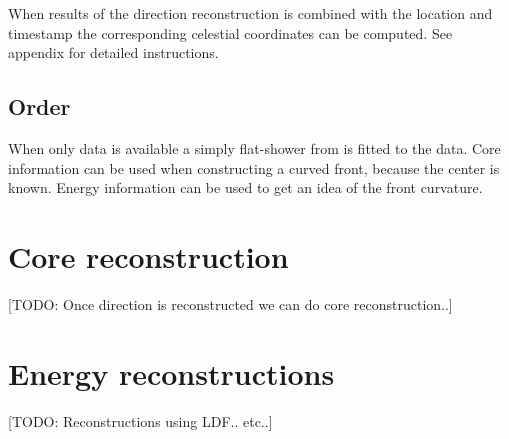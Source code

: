 When results of the direction reconstruction is combined with the \gps
location and timestamp the corresponding celestial coordinates can be
computed. See appendix for detailed instructions.


\subsection{Order}

When only data is available a simply flat-shower from is fitted to the
data. Core information can be used when constructing a curved front,
because the center is known. Energy information can be used to get an
idea of the front curvature.


\section{Core reconstruction}

[TODO: Once direction is reconstructed we can do core reconstruction..]


\section{Energy reconstructions}

[TODO: Reconstructions using LDF.. etc..]
